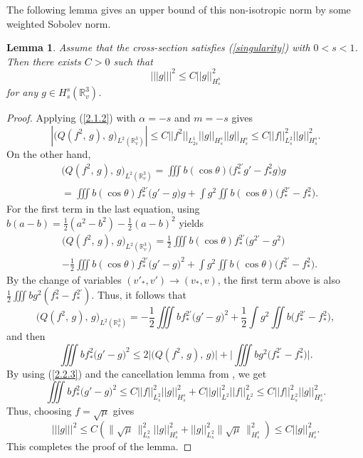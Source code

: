 \documentclass{amsart}[12pt, article]
\newtheorem{lemm}[theo]{Lemma}
\begin{document}
The following lemma gives
an upper bound of this non-isotropic norm
by some  weighted Sobolev norm.

\begin{lemm}\label{lemm2.2.1}
Assume that the cross-section
satisfies (\ref{singularity}) with  $0<s<1$. Then there exists $C>0$
such that
\begin{equation}\label{2.2.2}
||| g |||^2 \leq C || g||^2_{H^s_s}
\end{equation}
for any $g\in H^s_s({{{\mathbb R}}}^3_v)$.
\end{lemm}

\begin{proof} Applying (\ref{2.1.2}) with $\alpha=-s$ and $m=-s$
gives
\begin{equation}\label{2.2.3}
\left|\Big(Q (f^2,\, g),\, g \Big)_{L^2({{{\mathbb R}}}^3_v)} \right| \leq C
||f^2||_{L^1_{2s}} || g ||_{H^{s}_{s}} || g ||_{H^{s}_{s}} \leq C
||f||^2_{L^2_{s}} || g ||^2_{H^{s}_{s}}.
\end{equation}
On the other hand,
\begin{align*}
&\Big(Q(f^2,\,g),\,g\Big)_{L^2({{{\mathbb R}}}^3_v)} = \iiint b(\cos\theta)
\Big(f^{2'}_* g' -
f^2_* g\Big ) g\\
&= \iiint b(\cos\theta)f^{2'}_* \Big(g'-g\Big) g + \int g^2\iint
b(\cos\theta) \Big(f^{2'}_* -f^2_*\Big ).
\end{align*}
For the first term in the last equation, using
$b(a-b) = \frac{1}{2} (a^2 -b^2) - \frac{1}{2}
(a-b)^2$ yields
\begin{align*}
&\Big(Q(f^2,\, g),\, g\Big)_{L^2({{{\mathbb R}}}^3_v)} = \frac{1}{2}\iiint
b(\cos\theta)
f^{2'}_*\Big(g^{2'} - g^2\Big)\\
& - \frac{1}{2}\iiint b(\cos\theta) f^{2'}_* \Big(g'- g\Big)^2 +
\int g^2 \iint b(\cos\theta) \Big(f^{2'}_* -f^2_* \Big).
\end{align*}
By the change of variables $(v'_\ast, v') \rightarrow (v_\ast, v)$,
the first term above is also $\frac 1 2 \iiint b g^2 (f^2_\ast -f^{2
'}_\ast )$. Thus, it follows that
\begin{equation*}\label{2.2.3+0}
\Big(Q (f^2,\, g) ,\, g\Big)_{L^2({{{\mathbb R}}}^3_v)}
 = -\frac 1 2 \iiint b f^{2 '}_\ast \big(g'-g\big)^2 + \frac 1 2 \int g^2
 \iint b \Big(f^{2 '}_\ast -f^2_\ast \Big),
\end{equation*}
and then
$$
\iiint b f^2_\ast \big(g'-g\big)^2 \leq 2 \big| \Big(Q (f^2,\, g),\,
g\Big) \big| + \big|\iiint b g^2 \Big(f^{2 '}_\ast -f^2_\ast \Big) \big|.
$$
By using (\ref{2.2.3}) and the cancellation lemma {}from
\cite{al-1}, we get
\begin{equation}\label{2.2.3+}
\iiint b f^2_\ast \big(g'-g\big)^2\leq C ||f ||^2_{L^2_{s}} ||
g||^2_{H^s_s} + C|| g||^2_{L^2} || f ||^2_{L^2}\leq C || f
||^2_{L^2_s} || g ||^2_{H^s_s}.
\end{equation}
Thus, choosing $f=\sqrt{\mu}$ gives
$$
||| g |||^2 \leq C ( \|\sqrt{\mu}\,\|^2_{L^2_s}|| g ||^2_{H^s_s} +
|| g||^2_{L^2_s}\|\sqrt{\mu}\,\|^2_{H^s_s} ) \leq C || g
||^2_{H^s_s}.
$$
This completes the proof of the lemma.
\end{proof}
\end{document}
